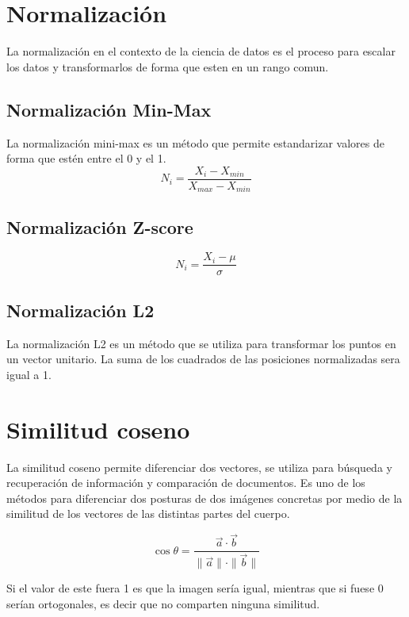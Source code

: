 

\section{Normalización} 
La normalización en el contexto de la ciencia de datos es el proceso para escalar los datos y transformarlos de forma que esten en un rango comun. 
\subsection{Normalización Min-Max}
La normalización mini-max es un método que permite estandarizar valores de forma que estén entre el 0 y el 1. 
\begin{equation}
	N_i = \frac{X_i - X_{min}}{X_{max} - X_{min}}
\end{equation}
\subsection{Normalización Z-score}
\begin{equation}
	N_i = \frac{X_i - \mu}{\sigma}
\end{equation}

\subsection{Normalización L2}
La normalización L2 es un método que se utiliza para transformar los puntos en un vector unitario. La suma de los cuadrados de las posiciones normalizadas sera igual a 1.

\section{Similitud coseno}
La similitud coseno permite diferenciar dos vectores, se utiliza para búsqueda y recuperación de información y comparación de documentos.
Es uno de los métodos para diferenciar dos posturas de dos imágenes concretas por medio de la similitud de los vectores de las distintas partes del cuerpo.

\begin{equation}
	\cos \theta = \frac{\vec{a} \cdot \vec{b}}{\lVert \vec{a} \lVert \cdot \lVert \vec{b} \lVert}
\end{equation}

Si el valor de este fuera 1 es que la imagen sería igual, mientras que si fuese 0 serían ortogonales, es decir que no comparten ninguna similitud.

